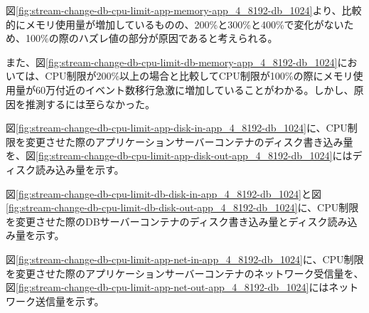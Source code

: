 \documentclass[../../../../main]{subfiles}
\begin{document}
    

    図\ref{fig:stream-change-db-cpu-limit-app-memory-app_4_8192-db_1024}より、比較的にメモリ使用量が増加しているものの、200\%と300\%と400\%で変化がないため、100\%の際のハズレ値の部分が原因であると考えられる。

    また、図\ref{fig:stream-change-db-cpu-limit-db-memory-app_4_8192-db_1024}においては、CPU制限が200\%以上の場合と比較してCPU制限が100\%の際にメモリ使用量が60万付近のイベント数移行急激に増加していることがわかる。しかし、原因を推測するには至らなかった。


    図\ref{fig:stream-change-db-cpu-limit-app-disk-in-app_4_8192-db_1024}に、CPU制限を変更させた際のアプリケーションサーバーコンテナのディスク書き込み量を、図\ref{fig:stream-change-db-cpu-limit-app-disk-out-app_4_8192-db_1024}にはディスク読み込み量を示す。

    
    

    図\ref{fig:stream-change-db-cpu-limit-db-disk-in-app_4_8192-db_1024}と図\ref{fig:stream-change-db-cpu-limit-db-disk-out-app_4_8192-db_1024}に、CPU制限を変更させた際のDBサーバーコンテナのディスク書き込み量とディスク読み込み量を示す。

    
    


    図\ref{fig:stream-change-db-cpu-limit-app-net-in-app_4_8192-db_1024}に、CPU制限を変更させた際のアプリケーションサーバーコンテナのネットワーク受信量を、図\ref{fig:stream-change-db-cpu-limit-app-net-out-app_4_8192-db_1024}にはネットワーク送信量を示す。

    
    
\end{document}
